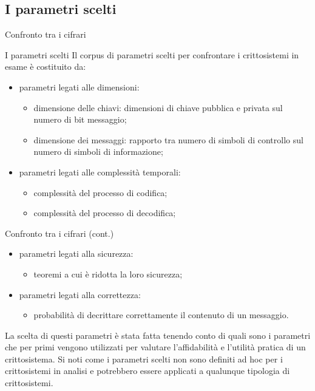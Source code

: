 \documentclass[10pt]{beamer}
\begin{document}
		\subsection{I parametri scelti}
			\begin{frame}{Confronto tra i cifrari}
				\begin{block}{I parametri scelti}
					Il corpus di parametri scelti per confrontare i crittosistemi in esame è costituito da:
					\begin{itemize}
						\item parametri legati alle dimensioni:
							\begin{itemize}
								\item dimensione delle chiavi: dimensioni di chiave pubblica e privata sul numero di bit messaggio;
								\item dimensione dei messaggi: rapporto tra numero di simboli di controllo sul numero di simboli di informazione;
							\end{itemize}
						\item parametri legati alle complessità temporali:
							\begin{itemize}
								\item complessità del processo di codifica;
								\item complessità del processo di decodifica;
							\end{itemize}
					\end{itemize}
				\end{block}
			\end{frame}
			\begin{frame}{Confronto tra i cifrari (cont.)}
				\begin{block}{}
					\begin{itemize}
						\item parametri legati alla sicurezza:
							\begin{itemize}
								\item teoremi a cui è ridotta la loro sicurezza;
							\end{itemize}
						\item parametri legati alla correttezza:
							\begin{itemize}
								\item probabilità di decrittare correttamente il contenuto di un messaggio.
							\end{itemize}
					\end{itemize}
					La scelta di questi parametri è stata fatta tenendo conto di quali sono i parametri che per primi vengono utilizzati per valutare l’affidabilità e l’utilità pratica di un crittosistema. Si noti come i parametri scelti non sono definiti ad hoc per i crittosistemi in analisi e potrebbero essere applicati a qualunque tipologia di crittosistemi.
				\end{block}
			\end{frame}
\end{document}
